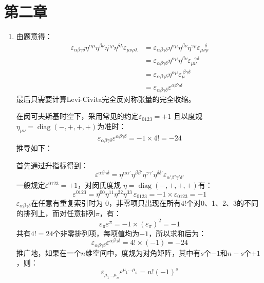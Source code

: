 \documentclass[a4paper]{article}
\DeclareMathOperator{\diag}{diag}
\renewcommand\epsilon\varepsilon
\begin{document}
\clearpage
\section*{第二章}

\begin{enumerate}
    \item[1.]
    由题意得：
    \begin{align*}
        \epsilon_{\alpha\beta\gamma\delta} \eta^{\alpha\mu} \eta^{\beta\nu} \eta^{\gamma\rho} \eta^{\delta\lambda} \epsilon_{\mu\nu\rho\lambda}
        &= \epsilon_{\alpha\beta\gamma\delta} \eta^{\alpha\mu} \eta^{\beta\nu} \eta^{\gamma\rho} \epsilon_{\mu\nu\rho}^{\ \ \ \ \delta} \\
        &= \epsilon_{\alpha\beta\gamma\delta} \eta^{\alpha\mu} \eta^{\beta\nu} \epsilon_{\mu\nu}^{\ \ \ \gamma\delta} \\
        &= \epsilon_{\alpha\beta\gamma\delta} \eta^{\alpha\mu} \epsilon_\mu^{\ \beta\gamma\delta} \\
        &= \epsilon_{\alpha\beta\gamma\delta} \epsilon^{\alpha\beta\gamma\delta}
    \end{align*}
    最后只需要计算Levi-Civita完全反对称张量的完全收缩。

    在闵可夫斯基时空下，采用常见的约定$\epsilon_{0123}=+1$ 且以度规$\eta_{\mu\nu}=\diag(-,+,+,+)$为准时：
    \[
    \epsilon_{\alpha\beta\gamma\delta} \epsilon^{\alpha\beta\gamma\delta} = -1 \times 4! = -24
    \]
    推导如下：

    首先通过升指标得到：
    \[
        \epsilon^{\alpha\beta\gamma\delta} = \eta^{\alpha\alpha'}\eta^{\beta\beta'}\eta^{\gamma\gamma'}\eta^{\delta\delta'} \epsilon_{\alpha'\beta'\gamma'\delta'}
    \]
    一般规定$\epsilon^{0123} = +1$，对闵氏度规 $\eta = \diag(-,+,+,+)$有：
    \[
        \epsilon^{0123}=\eta^{00}\eta^{11}\eta^{22}\eta^{33}\,\epsilon_{0123} = -1 \times \epsilon_{0123} = -1
    \]
    $\epsilon_{\alpha\beta\gamma\delta}$在任意有重复索引时为 0，非零项只出现在所有$4!$个对0、1、2、3的不同的排列上，而对任意排列$\pi$，有：
    \[
        \epsilon_{\pi} \epsilon^{\pi} = -1 \times (\epsilon_\pi)^2 = -1
    \]
    共有$4! = 24$个非零排列项，每项值均为$-1$，所以求和后为：
    \[
    \epsilon_{\alpha\beta\gamma\delta}\epsilon^{\alpha\beta\gamma\delta} = 4! \times (-1) = -24
    \]
    推广地，如果在一个$n$维空间中，度规为对角矩阵，其中有$s$个$-1$和$n-s$个$+1$，则：
    \[
    \epsilon_{\mu_1\ldots\mu_n} \epsilon^{\mu_1\ldots\mu_n} = n! (-1)^s
    \]


\end{enumerate}
\end{document}

